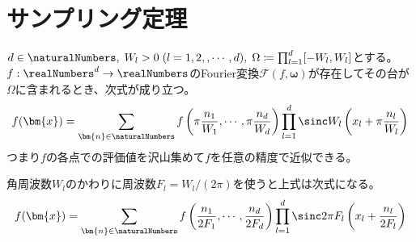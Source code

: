		\chapter{サンプリング定理}
			\begin{shadebox}
				$d\in\naturalNumbers,\;W_l>0\;(l=1,2,,\cdots,d),\;\Omega\coloneqq\prod_{l=1}^d [-W_l,W_l]$とする。
				$f:\realNumbers^d\to\realNumbers$のFourier変換$\mathcal{F}(f,\bm{\omega})$が存在してその台が$\Omega$に含まれるとき、次式が成り立つ。
				\[ f(\bm{x}) = \sum_{\bm{n}\in\naturalNumbers}f\left(\pi\frac{n_1}{W_1},\cdots,\pi\frac{n_d}{W_d}\right)\prod_{l=1}^d\sinc W_l\left(x_l + \pi\frac{n_l}{W_l}\right) \]
				つまり$f$の各点での評価値を沢山集めて$f$を任意の精度で近似できる。
				\par
				角周波数$W_l$のかわりに周波数$F_l=W_l/(2\pi)$を使うと上式は次式になる。
				\[ f(\bm{x}) = \sum_{\bm{n}\in\naturalNumbers}f\left(\frac{n_1}{2F_1},\cdots,\frac{n_d}{2F_d}\right)\prod_{l=1}^d\sinc 2\pi F_l\left(x_l + \frac{n_l}{2F_l}\right) \]
			\end{shadebox}
